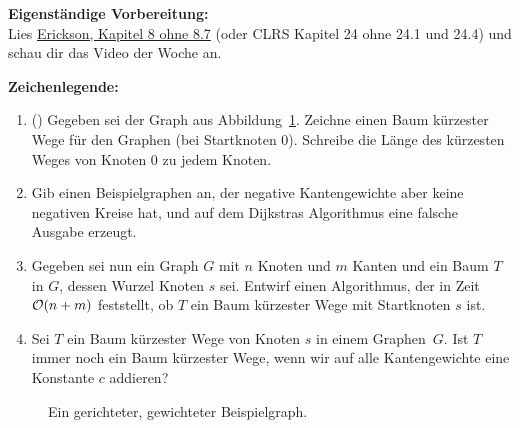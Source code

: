 \documentclass{uebung_cs}
\begin{document}
\textbf{Eigenständige Vorbereitung:}\\
Lies  \href{https://jeffe.cs.illinois.edu/teaching/algorithms/book/Algorithms-JeffE.pdf}{Erickson, Kapitel 8 ohne 8.7} (oder CLRS Kapitel 24 ohne 24.1 und 24.4) und schau dir das  Video der Woche an.

\textbf{Zeichenlegende:}
\legende{}


\begin{aufgabe}\label{tue-first}\mbox{}
	\begin{enumerate}
		\item (\warmup) Gegeben sei der Graph aus Abbildung~\ref{example_graph}.
		Zeichne einen Baum kürzester Wege für den Graphen (bei Startknoten 0).
		Schreibe die Länge des kürzesten Weges von Knoten 0 zu jedem Knoten.
		\item Gib einen Beispielgraphen an, der negative Kantengewichte aber keine negativen Kreise hat, und auf dem Dijkstras Algorithmus eine falsche Ausgabe erzeugt.
		\item Gegeben sei nun ein Graph $G$ mit $n$ Knoten und $m$ Kanten und ein Baum $T$ in $G$, dessen Wurzel Knoten $s$ sei.
		Entwirf einen Algorithmus, der in Zeit $\mathcal{O}(n+m)$ feststellt, ob $T$ ein Baum kürzester Wege mit Startknoten $s$ ist.
		\item Sei $T$ ein Baum kürzester Wege von Knoten $s$ in einem Graphen~$G$.
		Ist $T$ immer noch ein Baum kürzester Wege, wenn wir auf alle Kantengewichte eine Konstante $c$ addieren?
	\end{enumerate}
\end{aufgabe}
\begin{figure}[h]
	\begin{center}
		\caption{\label{example_graph}Ein gerichteter, gewichteter Beispielgraph.}
	\end{center}
\end{figure}
\end{document}
